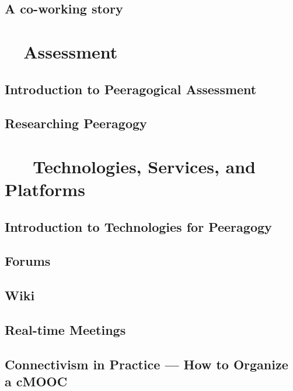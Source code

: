 \documentclass[ebook, 12pt, twoside]{memoir}
\begin{document}
\chapter[\textbf{A co-working story}]{A co-working story}
%



\part{~~Assessment} \label{assessment-part} %
%
\chapter[\textbf{Peeragogical Assessment}]{Introduction to Peeragogical Assessment}

%
\chapter[\textbf{Researching Peeragogy}]{Researching Peeragogy}
%



\part{~~~Technologies, Services, and Platforms } \label{technologies-part} %
%
\chapter[\textbf{Peeragogy Technology}]{Introduction to Technologies for Peeragogy}

%
\chapter[\textbf{Forums}]{ Forums } 
%

%
\chapter[\textbf{Wiki}]{ Wiki } 
%

%
\chapter[\textbf{Real-time Meetings}]{ Real-time Meetings } 
%

%
\chapter[\textbf{How to Organize a MOOC}]{ Connectivism in Practice ---  How to Organize a cMOOC}
%

\end{document}
